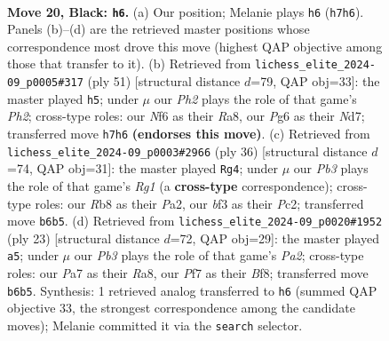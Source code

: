 \documentclass[11pt]{article}
\begin{document}
\clearpage

\begin{figure}[p]\centering
\begin{subfigure}{0.46\textwidth}\centering
\resizebox{\linewidth}{!}{%
\newchessgame
\chessboard[
  setfen={1rb2rk1/p3np1p/1p2pnp1/2P5/2P5/4PB1P/P1N2PP1/1RB1R1K1 b - - 0 20},
  showmover=false,
  pgfstyle=straightmove, color=movearrow, markmove={h7-h6}
]}
\caption{}
\end{subfigure}\hfill
\begin{subfigure}{0.46\textwidth}\centering
\resizebox{\linewidth}{!}{%
\newchessgame
\chessboard[
  setfen={r5k1/3n3p/2r1pn2/p2b1pp1/2pP4/B3PP2/P1R1B1PP/R3N1K1 b - - 0 26},
  showmover=false,
  pgfstyle=straightmove, color=movearrow, markmove={h7-h5}
]}
\caption{}
\end{subfigure}
\\[4pt]
\begin{subfigure}{0.46\textwidth}\centering
\resizebox{\linewidth}{!}{%
\newchessgame
\chessboard[
  setfen={r1b1r1k1/pp3p1p/2p3p1/2b3P1/4Pp2/2N2P2/PPPRB2P/2K3R1 w - - 1 19},
  showmover=false,
  pgfstyle=straightmove, color=movearrow, markmove={g1-g4}
]}
\caption{}
\end{subfigure}\hfill
\begin{subfigure}{0.46\textwidth}\centering
\resizebox{\linewidth}{!}{%
\newchessgame
\chessboard[
  setfen={r3kb1r/p4ppp/2p1pn2/2Pp1b2/1P6/2N3P1/1P2PP1P/R1B1KB1R b KQkq - 0 12},
  showmover=false,
  pgfstyle=straightmove, color=movearrow, markmove={a7-a5}
]}
\caption{}
\end{subfigure}
\caption{\textbf{Move 20, Black: \texttt{h6}.} (a) Our position; Melanie plays \texttt{h6} (\texttt{h7h6}). Panels (b)--(d) are the retrieved master positions whose correspondence most drove this move (highest QAP objective among those that transfer to it). (b) Retrieved from \texttt{lichess\_elite\_2024-09\_p0005\#317} (ply 51) [structural distance $d$=79, QAP obj=33]: the master played \texttt{h5}; under $\mu$ our \emph{Ph2} plays the role of that game's \emph{Ph2}; cross-type roles: our \emph{N}f6 as their \emph{R}a8, our \emph{P}g6 as their \emph{N}d7; transferred move \texttt{h7h6} \textbf{(endorses this move)}. (c) Retrieved from \texttt{lichess\_elite\_2024-09\_p0003\#2966} (ply 36) [structural distance $d$=74, QAP obj=31]: the master played \texttt{Rg4}; under $\mu$ our \emph{Pb3} plays the role of that game's \emph{Rg1} (a \textbf{cross-type} correspondence); cross-type roles: our \emph{R}b8 as their \emph{P}a2, our \emph{b}f3 as their \emph{P}c2; transferred move \texttt{b6b5}. (d) Retrieved from \texttt{lichess\_elite\_2024-09\_p0020\#1952} (ply 23) [structural distance $d$=72, QAP obj=29]: the master played \texttt{a5}; under $\mu$ our \emph{Pb3} plays the role of that game's \emph{Pa2}; cross-type roles: our \emph{P}a7 as their \emph{R}a8, our \emph{P}f7 as their \emph{B}f8; transferred move \texttt{b6b5}. Synthesis: 1 retrieved analog transferred to \texttt{h6} (summed QAP objective 33, the strongest correspondence among the candidate moves); Melanie committed it via the \texttt{search} selector.}
\label{fig:thought-m39}
\end{figure}
\end{document}
